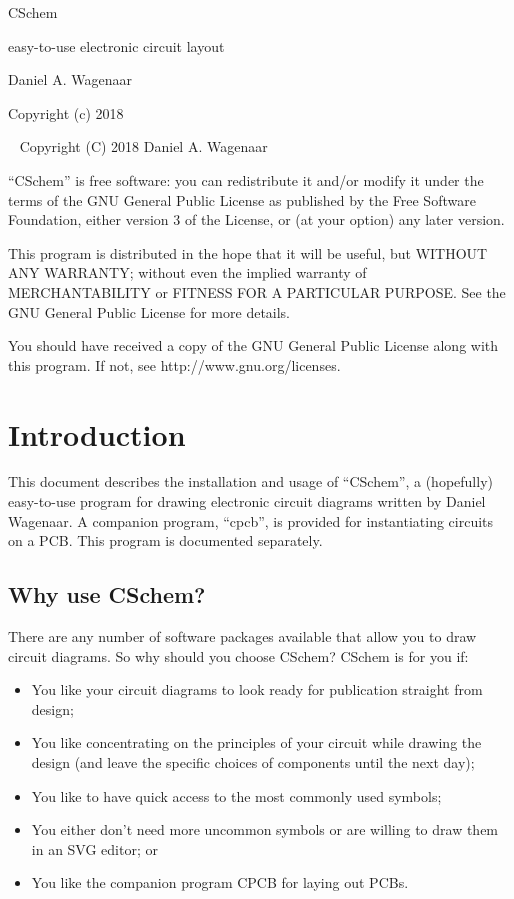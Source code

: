 \documentclass[11pt]{report}
\begin{document}
\thispagestyle{empty}
\begin{centering}
  {\Huge CSchem}
  \vskip30pt

  {\Large easy-to-use electronic circuit layout}
  \vskip60pt

  {\large Daniel A. Wagenaar}
  \vfill
  
  {Copyright (c) 2018}
  
\end{centering}
\pagebreak
~
\vfill
\noindent Copyright (C) 2018 Daniel A. Wagenaar\medskip

``CSchem'' is free software: you can redistribute it and/or modify
it under the terms of the GNU General Public License as published by
the Free Software Foundation, either version 3 of the License, or
(at your option) any later version.

This program is distributed in the hope that it will be useful,
but WITHOUT ANY WARRANTY; without even the implied warranty of
MERCHANTABILITY or FITNESS FOR A PARTICULAR PURPOSE.  See the
GNU General Public License for more details.

You should have received a copy of the GNU General Public License
along with this program.  If not, see http://www.gnu.org/licenses.
\pagebreak

\chapter{Introduction}

This document describes the installation and usage of ``CSchem'', a
(hopefully) easy-to-use program for drawing electronic circuit
diagrams written by Daniel Wagenaar. A companion program, ``cpcb'',
is provided for instantiating circuits on a PCB. This program is
documented separately.

\section{Why use CSchem?}

There are any number of software packages available that allow you to
draw circuit diagrams. So why should you choose CSchem? CSchem is
for you if:
\begin{itemize}
  \item You like your circuit diagrams to look ready for publication
    straight from design;
  \item You like concentrating on the principles of your circuit while
    drawing the design (and leave the specific choices of components
    until the next day);
  \item You like to have quick access to the most commonly used
    symbols;
    \item You either don't need more uncommon symbols or are willing
      to draw them in an SVG editor; or
      \item You like the companion program CPCB for laying out PCBs.
\end{itemize}\pagebreak
\end{document}
